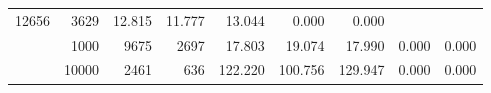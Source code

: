 \begin{table}
\begin{tabular}{rrrrrrrrr}
							     12656  & 3629  
	                           & 12.815 & 11.777 & 13.044
	                           & 0.000 & 0.000  \\
	                
	            
					 &  
					 
					\multirow{ 1 }{*}{ 1000 } &
					
						
							    
							     9675  & 2697  
	                           & 17.803 & 19.074 & 17.990
	                           & 0.000 & 0.000  \\
	                
	            
					 &  
					 
					\multirow{ 1 }{*}{ 10000 } &
					
						
							    
							     2461  & 636  
	                           & 122.220 & 100.756 & 129.947
	                           & 0.000 & 0.000  \\
	                
	            
	        

\hline

\end{tabular}
\end{table}
\clearpage


	    

